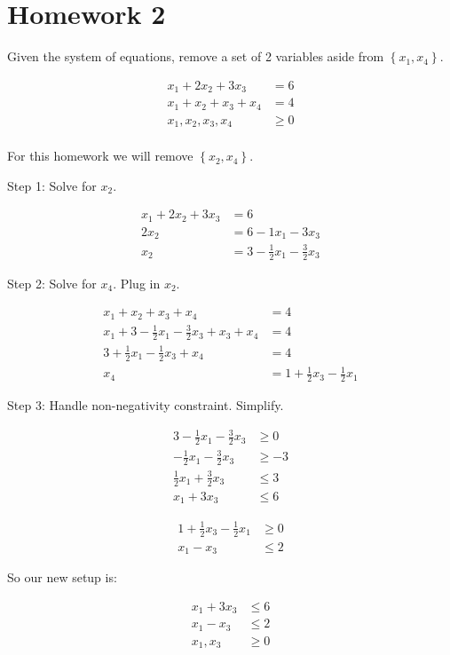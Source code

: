 \section*{Homework 2}

Given the system of equations, remove a set of 2 variables aside from $\left\{ x_1, x_4 \right\}$.

\begin{align*}
	x_1 + 2x_2 + 3x_3 &= 6 \\
	x_1 + x_2 + x_3 + x_4 &= 4 \\
	x_1, x_2, x_3, x_4 &\geq 0 \\
\end{align*}

For this homework we will remove $\left\{ x_2, x_4 \right\}$.

Step 1: Solve for $x_2$.

\begin{align*}
	x_1 + 2x_2 + 3x_3 &= 6 \\
	2x_2 &= 6 - 1x_1 - 3x_3 \\
	x_2 &= 3 - \frac{1}{2}x_1 - \frac{3}{2}x_3 
\end{align*}

Step 2: Solve for $x_4$. Plug in $x_2$.

\begin{align*}
	x_1 + x_2 + x_3 + x_4 &= 4 \\
	x_1 + 3 - \frac{1}{2}x_1 - \frac{3}{2}x_3 + x_3 + x_4 &= 4 \\
	3 + \frac{1}{2}x_1 - \frac{1}{2}x_3 + x_4 &= 4 \\
	x_4 &= 1 + \frac{1}{2}x_3 - \frac{1}{2}x_1
\end{align*}

Step 3: Handle non-negativity constraint. Simplify.

\begin{align*}
	3 - \frac{1}{2}x_1 - \frac{3}{2}x_3 &\geq 0 \\
	- \frac{1}{2}x_1 - \frac{3}{2}x_3 &\geq -3 \\
	\frac{1}{2}x_1 + \frac{3}{2}x_3 &\leq 3 \\
	x_1 + 3x_3 &\leq 6
\end{align*}

\begin{align*}
	1 + \frac{1}{2}x_3 - \frac{1}{2}x_1 &\geq 0 \\
	x_1 - x_3 &\leq 2
\end{align*}

So our new setup is:

\begin{align*}
	x_1 + 3x_3 &\leq 6 \\
	x_1 - x_3 &\leq 2 \\
	x_1, x_3 &\geq 0
\end{align*}
